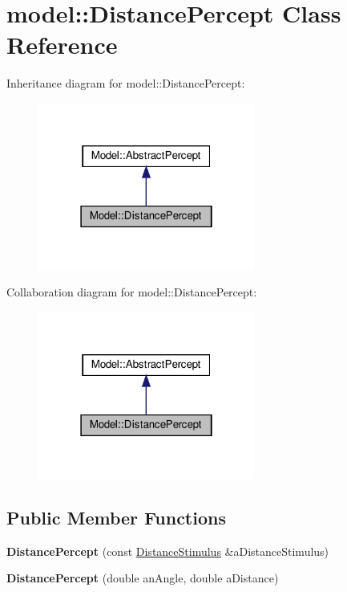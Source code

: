 \hypertarget{class_model_1_1_distance_percept}{}\section{model\+:\+:Distance\+Percept Class Reference}
\label{class_model_1_1_distance_percept}


Inheritance diagram for model\+:\+:Distance\+Percept\+:
\nopagebreak
\begin{figure}[H]
\begin{center}
\leavevmode
\includegraphics[width=202pt]{class_model_1_1_distance_percept__inherit__graph}
\end{center}
\end{figure}


Collaboration diagram for model\+:\+:Distance\+Percept\+:
\nopagebreak
\begin{figure}[H]
\begin{center}
\leavevmode
\includegraphics[width=202pt]{class_model_1_1_distance_percept__coll__graph}
\end{center}
\end{figure}
\subsection*{Public Member Functions}
\begin{DoxyCompactItemize}
\item 
{\bfseries Distance\+Percept} (const \hyperlink{class_model_1_1_distance_stimulus}{Distance\+Stimulus} \&a\+Distance\+Stimulus)\hypertarget{class_model_1_1_distance_percept_ab3cca9b4d5a5b837124688f9bab2e7f7}{}\label{class_model_1_1_distance_percept_ab3cca9b4d5a5b837124688f9bab2e7f7}

\item 
{\bfseries Distance\+Percept} (double an\+Angle, double a\+Distance)\hypertarget{class_model_1_1_distance_percept_a476417dd79dead365451b522d40a6995}{}\label{class_model_1_1_distance_percept_a476417dd79dead365451b522d40a6995}

\end{DoxyCompactItemize}
